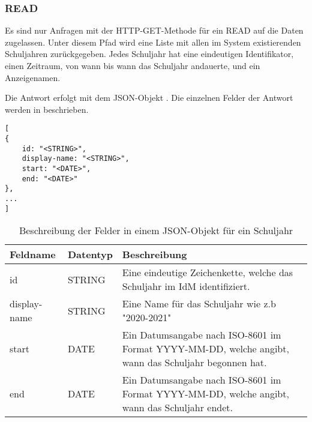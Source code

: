 \subsubsection{READ}
\label{sec:rest:api:school-years:read}
Es sind nur Anfragen mit der HTTP-GET-Methode für ein READ auf die Daten zugelassen.
Unter diesem Pfad wird eine Liste mit allen im System existierenden Schuljahren zurückgegeben.
Jedes Schuljahr hat eine eindeutigen Identifikator, einen Zeitraum, von wann bis wann das Schuljahr andauerte, und ein Anzeigenamen.

Die Antwort erfolgt mit dem JSON-Objekt . 
Die einzelnen Felder der Antwort werden in  beschrieben.

\begin{lstlisting}[caption={JSON-Antwort für einen GET-Aufruf des Pfads /api/school-years},label={lst:code:rest:api:school-years:read:ret},frame=tlrb]
[
{
    id: "<STRING>",
    display-name: "<STRING>",
    start: "<DATE>",
    end: "<DATE>"
},
...
]
\end{lstlisting}

\begin{longtable}{|p{}|p{}|p{}|}
		\caption{Beschreibung der Felder in einem JSON-Objekt für ein Schuljahr}
\endfoot
		\caption{Beschreibung der Felder in einem JSON-Objekt für ein Schuljahr}
		\label{tab:rest:api:school-years:read:ret:json}
\endlastfoot 
\hline
			\textbf{Feldname} & \textbf{Datentyp} & \textbf{Beschreibung} \\ \hline
\endhead
 id & STRING & Eine eindeutige Zeichenkette, welche das Schuljahr im IdM identifiziert. \\ \hline
 display-name & STRING & Eine Name für das Schuljahr wie z.b "2020-2021" \\ \hline
 start & DATE & Ein Datumsangabe nach ISO-8601 im Format YYYY-MM-DD, welche angibt, wann das Schuljahr begonnen hat. \\ \hline
 end & DATE & Ein Datumsangabe nach ISO-8601 im Format YYYY-MM-DD, welche angibt, wann das Schuljahr endet. \\ \hline
\end{longtable}
